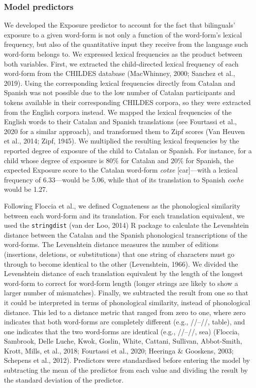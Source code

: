 \documentclass[
  12pt,
  b5paperpaper,
  twoside]{scrreprt}
\begin{document}
\hypertarget{sec-predictors}{%
\subsubsection{Model predictors}\label{sec-predictors}}

We developed the Exposure predictor to account for the fact that
bilinguals' exposure to a given word-form is not only a function of the
word-form's lexical frequency, but also of the quantitative input they
receive from the language such word-form belongs to. We expressed
lexical frequencies as the product between both variables. First, we
extracted the child-directed lexical frequency of each word-form from
the CHILDES database (MacWhinney, 2000; Sanchez et al., 2019). Using the
corresponding lexical frequencies directly from Catalan and Spanish was
not possible due to the low number of Catalan participants and tokens
available in their corresponding CHILDES corpora, so they were extracted
from the English corpora instead. We mapped the lexical frequencies of
the English words to their Catalan and Spanish translations (see
Fourtassi et al., 2020 for a similar approach), and transformed them to
Zipf scores (Van Heuven et al., 2014; Zipf, 1945). We multiplied the
resulting lexical frequencies by the reported degree of exposure of the
child to Catalan or Spanish. For instance, for a child whose degree of
exposure is 80\% for Catalan and 20\% for Spanish, the expected Exposure
score to the Catalan word-form \emph{cotxe} {[}car{]}---with a lexical
frequency of 6.33---would be 5.06, while that of its translation to
Spanish \emph{coche} would be 1.27.

Following Floccia et al., we defined Cognateness as the phonological
similarity between each word-form and its translation. For each
translation equivalent, we used the \texttt{stringdist} (van der Loo,
2014) R package to calculate the Levenshtein distance between the
Catalan and the Spanish phonological transcriptions of the word-forms.
The Levenshtein distance measures the number of editions (insertions,
deletions, or substitutions) that one string of characters must go
through to become identical to the other (Levenshtein, 1966). We divided
the Levenshtein distance of each translation equivalent by the length of
the longest word-form to correct for word-form length (longer strings
are likely to show a larger number of mismatches). Finally, we
subtracted the result from one so that it could be interpreted in terms
of phonological similarity, instead of phonological distance. This led
to a distance metric that ranged from zero to one, where zero indicates
that both word-forms are completely different (e.g.,
//--//, table), and one indicates that
the two word-forms are identical (e.g.,
//--//, sea) (Floccia, Sambrook, Delle
Luche, Kwok, Goslin, White, Cattani, Sullivan, Abbot-Smith, Krott,
Mills, et al., 2018; Fourtassi et al., 2020; Heeringa \& Gooskens, 2003;
Schepens et al., 2012). Predictors were standardised before entering the
model by subtracting the mean of the predictor from each value and
dividing the result by the standard deviation of the predictor.
\end{document}
